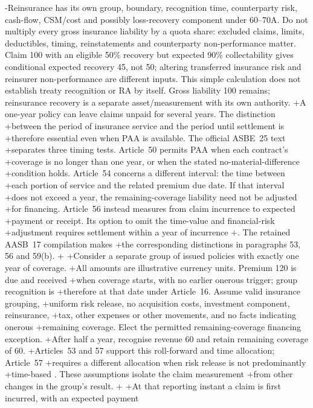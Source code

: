 -Reinsurance has its own group, boundary, recognition time, counterparty risk, cash-flow, CSM/cost and possibly loss-recovery component under 60--70A. Do not multiply every gross insurance liability by a quota share: excluded claims, limits, deductibles, timing, reinstatements and counterparty non-performance matter. Claim 100 with an eligible 50\% recovery but expected 90\% collectability gives conditional expected recovery 45, not 50; altering transferred insurance risk and reinsurer non-performance are different inputs. This simple calculation does not establish treaty recognition or RA by itself. Gross liability 100 remains; reinsurance recovery is a separate asset/measurement with its own authority.
+A one-year policy can leave claims unpaid for several years. The distinction
+between the period of insurance service and the period until settlement is
+therefore essential even when PAA is available. The official ASBE~25 text
+separates three timing tests. Article~50 permits PAA when each contract's
+coverage is no longer than one year, or when the stated no-material-difference
+condition holds. Article~54 concerns a different interval: the time between
+each portion of service and the related premium due date. If that interval
+does not exceed a year, the remaining-coverage liability need not be adjusted
+for financing. Article~56 instead measures from claim incurrence to expected
+payment or receipt. Its option to omit the time-value and financial-risk
+adjustment requires settlement within a year of incurrence
+\citep[Articles 50, 54, 56]{mofasbe25}. The retained AASB~17 compilation makes
+the corresponding distinctions in paragraphs 53, 56 and 59(b).
+
+Consider a separate group of issued policies with exactly one year of coverage.
+All amounts are illustrative currency units. Premium 120 is due and received
+when coverage starts, with no earlier onerous trigger; group recognition is
+therefore at that date under Article~16. Assume valid insurance grouping,
+uniform risk release, no acquisition costs, investment component, reinsurance,
+tax, other expenses or other movements, and no facts indicating onerous
+remaining coverage. Elect the permitted remaining-coverage financing exception.
+After half a year, recognise revenue 60 and retain remaining coverage of 60.
+Articles~53 and 57 support this roll-forward and time allocation; Article~57
+requires a different allocation when risk release is not predominantly
+time-based \citep{mofasbe25}. These assumptions isolate the claim measurement
+from other changes in the group's result.
+
+At that reporting instant a claim is first incurred, with an expected payment
